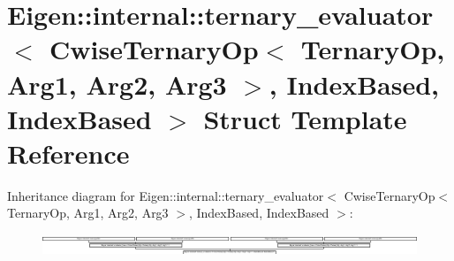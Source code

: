 \hypertarget{struct_eigen_1_1internal_1_1ternary__evaluator_3_01_cwise_ternary_op_3_01_ternary_op_00_01_arg1_daf42d21bcfee99cfa54e03ffa9506fc}{}\section{Eigen\+:\+:internal\+:\+:ternary\+\_\+evaluator$<$ Cwise\+Ternary\+Op$<$ Ternary\+Op, Arg1, Arg2, Arg3 $>$, Index\+Based, Index\+Based $>$ Struct Template Reference}
\label{struct_eigen_1_1internal_1_1ternary__evaluator_3_01_cwise_ternary_op_3_01_ternary_op_00_01_arg1_daf42d21bcfee99cfa54e03ffa9506fc}
Inheritance diagram for Eigen\+:\+:internal\+:\+:ternary\+\_\+evaluator$<$ Cwise\+Ternary\+Op$<$ Ternary\+Op, Arg1, Arg2, Arg3 $>$, Index\+Based, Index\+Based $>$\+:\begin{figure}[H]
\begin{center}
\leavevmode
\includegraphics[height=0.625000cm]{struct_eigen_1_1internal_1_1ternary__evaluator_3_01_cwise_ternary_op_3_01_ternary_op_00_01_arg1_daf42d21bcfee99cfa54e03ffa9506fc}
\end{center}
\end{figure}
